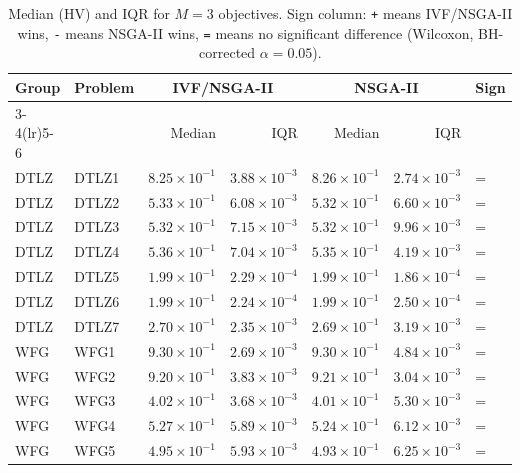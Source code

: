 \begin{table}[t]
\centering
\caption{Median (HV) and IQR for $M=3$ objectives. Sign column: \texttt{+} means IVF/NSGA-II wins, \texttt{-} means NSGA-II wins, \texttt{=} means no significant difference (Wilcoxon, BH-corrected $\alpha=0.05$).}
\label{tab:hv_m3_ivfnsgaii}
\scriptsize
\begin{tabular}{llrrrrl}
\toprule
Group & Problem & \multicolumn{2}{c}{IVF/NSGA-II} & \multicolumn{2}{c}{NSGA-II} & Sign \\
\cmidrule(lr){3-4}\cmidrule(lr){5-6}
 & & Median & IQR & Median & IQR & \\
\midrule
DTLZ & DTLZ1 & $8.25\!\times\!10^{-1}$ & $3.88\!\times\!10^{-3}$ & $8.26\!\times\!10^{-1}$ & $2.74\!\times\!10^{-3}$ & = \\
DTLZ & DTLZ2 & $5.33\!\times\!10^{-1}$ & $6.08\!\times\!10^{-3}$ & $5.32\!\times\!10^{-1}$ & $6.60\!\times\!10^{-3}$ & = \\
DTLZ & DTLZ3 & $5.32\!\times\!10^{-1}$ & $7.15\!\times\!10^{-3}$ & $5.32\!\times\!10^{-1}$ & $9.96\!\times\!10^{-3}$ & = \\
DTLZ & DTLZ4 & $5.36\!\times\!10^{-1}$ & $7.04\!\times\!10^{-3}$ & $5.35\!\times\!10^{-1}$ & $4.19\!\times\!10^{-3}$ & = \\
DTLZ & DTLZ5 & $1.99\!\times\!10^{-1}$ & $2.29\!\times\!10^{-4}$ & $1.99\!\times\!10^{-1}$ & $1.86\!\times\!10^{-4}$ & = \\
DTLZ & DTLZ6 & $1.99\!\times\!10^{-1}$ & $2.24\!\times\!10^{-4}$ & $1.99\!\times\!10^{-1}$ & $2.50\!\times\!10^{-4}$ & = \\
DTLZ & DTLZ7 & $2.70\!\times\!10^{-1}$ & $2.35\!\times\!10^{-3}$ & $2.69\!\times\!10^{-1}$ & $3.19\!\times\!10^{-3}$ & = \\
\addlinespace
WFG & WFG1 & $9.30\!\times\!10^{-1}$ & $2.69\!\times\!10^{-3}$ & $9.30\!\times\!10^{-1}$ & $4.84\!\times\!10^{-3}$ & = \\
WFG & WFG2 & $9.20\!\times\!10^{-1}$ & $3.83\!\times\!10^{-3}$ & $9.21\!\times\!10^{-1}$ & $3.04\!\times\!10^{-3}$ & = \\
WFG & WFG3 & $4.02\!\times\!10^{-1}$ & $3.68\!\times\!10^{-3}$ & $4.01\!\times\!10^{-1}$ & $5.30\!\times\!10^{-3}$ & = \\
WFG & WFG4 & $5.27\!\times\!10^{-1}$ & $5.89\!\times\!10^{-3}$ & $5.24\!\times\!10^{-1}$ & $6.12\!\times\!10^{-3}$ & = \\
WFG & WFG5 & $4.95\!\times\!10^{-1}$ & $5.93\!\times\!10^{-3}$ & $4.93\!\times\!10^{-1}$ & $6.25\!\times\!10^{-3}$ & = \\

\end{tabular}
\end{table}

